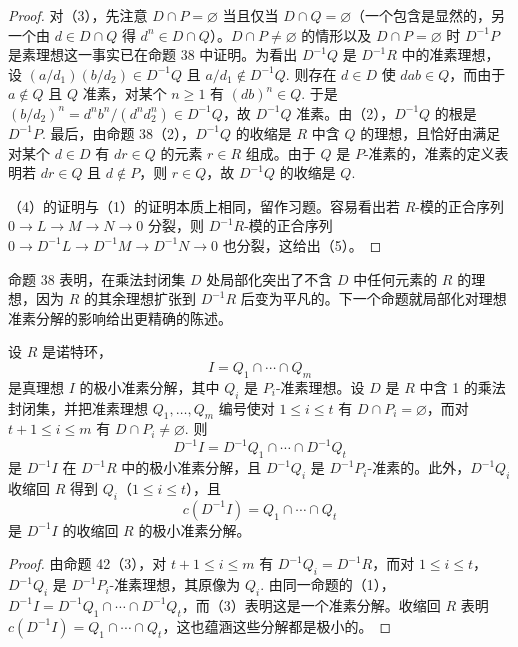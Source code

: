 \begin{proof}
对（3），先注意 \(D \cap P = \varnothing\) 当且仅当 \(D \cap Q = \varnothing\)（一个包含是显然的，另一个由 \(d \in D \cap Q\) 得 \(d^n \in D \cap Q\)）。\(D \cap P \neq \varnothing\) 的情形以及 \(D \cap P = \varnothing\) 时 \(D^{-1}P\) 是素理想这一事实已在命题 38 中证明。为看出 \(D^{-1}Q\) 是 \(D^{-1}R\) 中的准素理想，设 \((a/d_1)(b/d_2) \in D^{-1}Q\) 且 \(a/d_1 \notin D^{-1}Q\). 则存在 \(d \in D\) 使 \(dab \in Q\)，而由于 \(a \notin Q\) 且 \(Q\) 准素，对某个 \(n \geq 1\) 有 \((db)^n \in Q\). 于是 \((b/d_2)^n = d^nb^n/(d^nd_2^n) \in D^{-1}Q\)，故 \(D^{-1}Q\) 准素。由（2），\(D^{-1}Q\) 的根是 \(D^{-1}P\). 最后，由命题 38（2），\(D^{-1}Q\) 的收缩是 \(R\) 中含 \(Q\) 的理想，且恰好由满足对某个 \(d \in D\) 有 \(dr \in Q\) 的元素 \(r \in R\) 组成。由于 \(Q\) 是 \(P\)-准素的，准素的定义表明若 \(dr \in Q\) 且 \(d \notin P\)，则 \(r \in Q\)，故 \(D^{-1}Q\) 的收缩是 \(Q\).

（4）的证明与（1）的证明本质上相同，留作习题。容易看出若 \(R\)-模的正合序列 \(0 \to L \to M \to N \to 0\) 分裂，则 \(D^{-1}R\)-模的正合序列 \(0 \to D^{-1}L \to D^{-1}M \to D^{-1}N \to 0\) 也分裂，这给出（5）。
\end{proof}

命题 38 表明，在乘法封闭集 \(D\) 处局部化突出了不含 \(D\) 中任何元素的 \(R\) 的理想，因为 \(R\) 的其余理想扩张到 \(D^{-1}R\) 后变为平凡的。下一个命题就局部化对理想准素分解的影响给出更精确的陈述。

\begin{proposition}\label{pro:15.43}
设 \(R\) 是诺特环，
\[
I = Q_1 \cap \cdots \cap Q_m
\]
是真理想 \(I\) 的极小准素分解，其中 \(Q_i\) 是 \(P_i\)-准素理想。设 \(D\) 是 \(R\) 中含 1 的乘法封闭集，并把准素理想 \(Q_1, \ldots, Q_m\) 编号使对 \(1 \leq i \leq t\) 有 \(D \cap P_i = \varnothing\)，而对 \(t+1 \leq i \leq m\) 有 \(D \cap P_i \neq \varnothing\). 则
\[
D^{-1}I = D^{-1}Q_1 \cap \cdots \cap D^{-1}Q_t
\]
是 \(D^{-1}I\) 在 \(D^{-1}R\) 中的极小准素分解，且 \(D^{-1}Q_i\) 是 \(D^{-1}P_i\)-准素的。此外，\(D^{-1}Q_i\) 收缩回 \(R\) 得到 \(Q_i\)（\(1 \leq i \leq t\)），且
\[
c(D^{-1}I) = Q_1 \cap \cdots \cap Q_t
\]
是 \(D^{-1}I\) 的收缩回 \(R\) 的极小准素分解。
\end{proposition}

\begin{proof}
由命题 42（3），对 \(t+1 \leq i \leq m\) 有 \(D^{-1}Q_i = D^{-1}R\)，而对 \(1 \leq i \leq t\)，\(D^{-1}Q_i\) 是 \(D^{-1}P_i\)-准素理想，其原像为 \(Q_i\). 由同一命题的（1），\(D^{-1}I = D^{-1}Q_1 \cap \cdots \cap D^{-1}Q_t\)，而（3）表明这是一个准素分解。收缩回 \(R\) 表明 \(c(D^{-1}I) = Q_1 \cap \cdots \cap Q_t\)，这也蕴涵这些分解都是极小的。
\end{proof}

